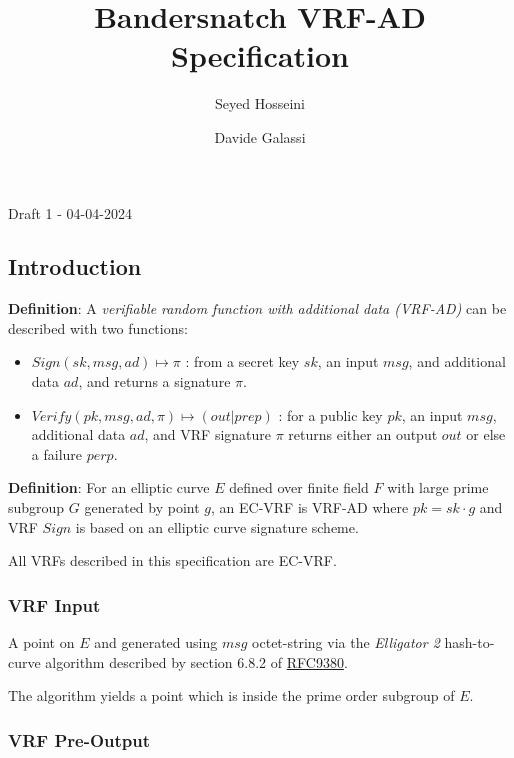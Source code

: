 \documentclass[
]{article}
\title{Bandersnatch VRF-AD Specification}
\author{Seyed Hosseini \and Davide Galassi}
\date{}
\providecommand{\tightlist}{%
  \setlength{\itemsep}{0pt}\setlength{\parskip}{0pt}}
\begin{document}
\maketitle

Draft 1 - 04-04-2024

\hypertarget{introduction}{%
\subsection{Introduction}\label{introduction}}

\textbf{Definition}: A \emph{verifiable random function with additional
data (VRF-AD)} can be described with two functions:

\begin{itemize}
\tightlist
\item
  \(Sign(sk,msg,ad) \mapsto \pi\) : from a secret key \(sk\), an input
  \(msg\), and additional data \(ad\), and returns a signature \(\pi\).
\item
  \(Verify(pk,msg,ad,\pi) \mapsto (out|prep)\) : for a public key
  \(pk\), an input \(msg\), additional data \(ad\), and VRF signature
  \(\pi\) returns either an output \(out\) or else a failure \(perp\).
\end{itemize}

\textbf{Definition}: For an elliptic curve \(E\) defined over finite
field \(F\) with large prime subgroup \(G\) generated by point \(g\), an
EC-VRF is VRF-AD where \(pk = sk \cdot g\) and VRF \(Sign\) is based on
an elliptic curve signature scheme.

All VRFs described in this specification are EC-VRF.

\hypertarget{vrf-input}{%
\subsubsection{VRF Input}\label{vrf-input}}

A point on \(E\) and generated using \(msg\) octet-string via the
\emph{Elligator 2} hash-to-curve algorithm described by section 6.8.2 of
\href{https://datatracker.ietf.org/doc/rfc9380/}{RFC9380}.

The algorithm yields a point which is inside the prime order subgroup of
\(E\).

\hypertarget{vrf-pre-output}{%
\subsubsection{VRF Pre-Output}\label{vrf-pre-output}}
\end{document}
